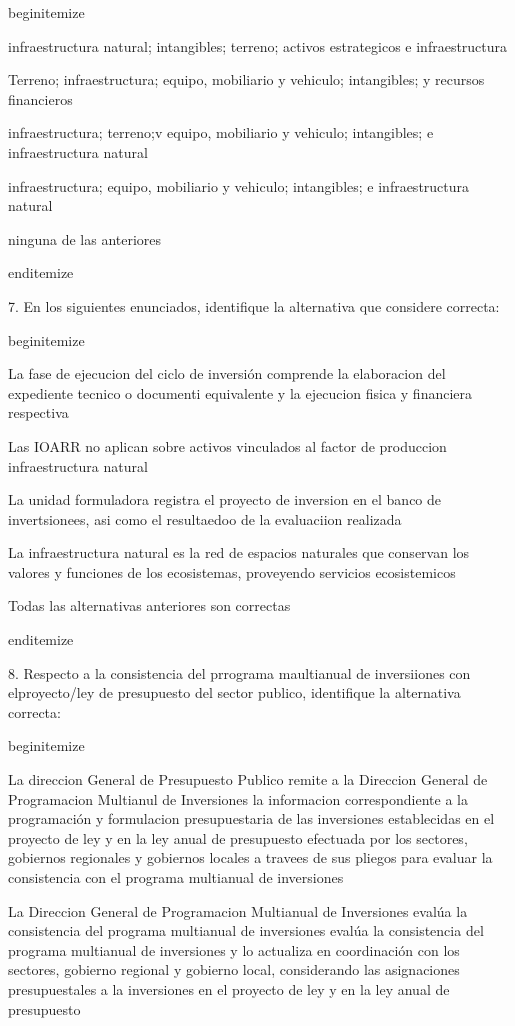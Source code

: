 begin{itemize}
				\item infraestructura natural; intangibles; terreno; activos estrategicos e infraestructura
				\item Terreno; infraestructura; equipo, mobiliario y vehiculo; intangibles; y recursos financieros
				\item infraestructura; terreno;v equipo, mobiliario y vehiculo; intangibles; e infraestructura natural
				\item infraestructura; equipo, mobiliario y vehiculo; intangibles; e infraestructura natural
				\item ninguna de las anteriores


end{itemize}


7. En los siguientes enunciados, identifique la alternativa que considere correcta:

begin{itemize}
				\item La fase de ejecucion del ciclo de inversión comprende la elaboracion del expediente tecnico o documenti equivalente y la ejecucion fisica y financiera respectiva
				\item Las IOARR no aplican sobre activos vinculados al factor de produccion infraestructura natural
				\item La unidad formuladora registra el proyecto de inversion en el banco de invertsionees, asi como el resultaedoo de la evaluaciion realizada
				\item La infraestructura natural es la red de espacios naturales que conservan los valores y funciones de los ecosistemas, proveyendo servicios ecosistemicos
				\item Todas las alternativas anteriores son correctas


end{itemize}

8. Respecto a la consistencia del prrograma maultianual de inversiiones con elproyecto/ley de presupuesto del sector publico, identifique la alternativa correcta:

begin{itemize}
				\item La direccion General de Presupuesto Publico remite a la Direccion General de Programacion Multianul de Inversiones la informacion correspondiente a la programación y formulacion presupuestaria de las inversiones establecidas en el proyecto de ley y en la ley anual de presupuesto efectuada por los sectores, gobiernos regionales y gobiernos locales a travees de sus pliegos para evaluar la consistencia con el programa multianual de inversiones 
				\item La Direccion General de Programacion Multianual de Inversiones evalúa la consistencia del programa multianual de inversiones evalúa la consistencia del programa multianual de inversiones y lo actualiza en coordinación con los sectores, gobierno regional y gobierno local, considerando las asignaciones presupuestales a la inversiones en el proyecto de ley y en la ley anual de presupuesto 

